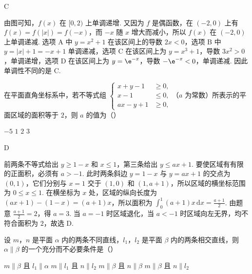 \begin{answer}
C
\end{answer}

\begin{solution}
由图可知，\(f(x)\) 在 \([0,2)\) 上单调递增. 又因为 \(f\) 是偶函数，在 \((-2,0)\) 上有 \(f(x)=f(|x|)=f(-x)\)，而 \(-x\) 随 \(x\) 增大而减小，所以 \(f(x)\) 在 \((-2,0)\) 上单调递减. 选项 A 中 \(y=x^2+1\) 在该区间上的导数 \(2x<0\)，选项 B 中 \(y=|x|+1=-x+1\) 单调递减，选项 C 在该区间上为 \(y=x^3+1\)，导数 \(3x^2>0\)，单调递增，选项 D 在该区间上为 \(y=\e^{-x}\)，导数 \(-\e^{-x}<0\)，单调递减. 因此单调性不同的是 C.
\end{solution}

\begin{problem}
在平面直角坐标系中，若不等式组 \( \begin{cases}
x+y-1&\geqslant0,\\
x-1&\leqslant0,\\
ax-y+1&\geqslant0,
\end{cases} \)（\(a\) 为常数）所表示的平面区域的面积等于 \(2\)，则 \(a\) 的值为（\quad）

\choices
    {\(-5\)}
    {\(1\)}
    {\(2\)}
    {\(3\)}
\end{problem}

\begin{answer}
D
\end{answer}

\begin{solution}
前两条不等式给出 \(y\geqslant1-x\) 和 \(x\leqslant1\)，第三条给出 \(y\leqslant ax+1\). 要使区域有有限的正面积，必须有 \(a>-1\). 此时两条斜边 \(y=1-x\) 与 \(y=ax+1\) 的交点为 \((0,1)\)，它们分别与 \(x=1\) 交于 \((1,0)\) 和 \((1,a+1)\)，所以区域的横坐标范围为 \(0\leqslant x\leqslant1\). 在横坐标为 \(x\) 处，区域的纵向长度为 \((ax+1)-(1-x)=(a+1)x\)，所以面积为 \(\int_0^1(a+1)x\,\mathrm{d}x=\frac{a+1}{2}\). 由题意 \(\frac{a+1}{2}=2\)，得 \(a=3\). 当 \(a=-1\) 时区域退化，当 \(a<-1\) 时区域向左无界，均不符合面积为 \(2\)，故选 D.
\end{solution}

\begin{problem}
设 \(m\)，\(n\) 是平面 \(\alpha\) 内的两条不同直线，\(l_{1}\)，\(l_{2}\) 是平面 \(\beta\) 内的两条相交直线，则 \(\alpha \parallel \beta\) 的一个充分而不必要条件是（\quad）

\choices
    {\(m \parallel \beta\) 且 \(l_{1} \parallel \alpha\)}
    {\(m \parallel l_{1}\) 且 \(n \parallel l_{2}\)}
    {\(m \parallel \beta\) 且 \(n \parallel \beta\)}
    {\(m \parallel \beta\) 且 \(n \parallel l_{2}\)}
\end{problem}

